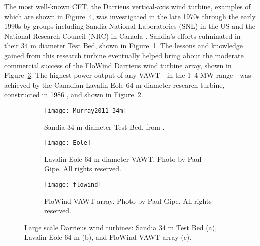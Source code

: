 The most well-known CFT, the Darrieus vertical-axis wind turbine, examples of
which are shown in Figure~\ref{fig:Darrieus}, was investigated in the late 1970s
through the early 1990s by groups including Sandia National Laboratories (SNL)
in the US and the National Research Council (NRC) in Canada \cite{Para2002}.
Sandia's efforts culminated in their 34 m diameter Test Bed, shown in
Figure~\ref{fig:Sandia-34m}. The lessons and knowledge gained from this research
turbine eventually helped bring about the moderate commercial success of the
FloWind Darrieus wind turbine array, shown in Figure~\ref{fig:FloWind}. The
highest power output of any VAWT---in the 1--4 MW range---was achieved by the
Canadian Lavalin Eole 64 m diameter research turbine, constructed in 1986
\cite{Para2002}, and shown in Figure~\ref{fig:Eole}.

\begin{figure}
    \centering

    \begin{subfigure}[b]{0.625\textwidth}
        \centering

        \texttt{[image: Murray2011-34m]}

        \caption{Sandia 34 m diameter Test Bed, from \cite{Murray2011}.}

        \label{fig:Sandia-34m}
    \end{subfigure}
    \hfill
    \begin{subfigure}[b]{0.352\textwidth}
        \centering

        \texttt{[image: Eole]}

        \caption{Lavalin Eole 64 m diameter VAWT. Photo by Paul Gipe. All rights
            reserved.}

        \label{fig:Eole}
    \end{subfigure}

    \begin{subfigure}[b]{0.8\textwidth}
        \centering

        \texttt{[image: flowind]}

        \caption{FloWind VAWT array. Photo by Paul Gipe. All rights reserved.}

        \label{fig:FloWind}
    \end{subfigure}

    \caption{Large scale Darrieus wind turbines: Sandia 34 m Test Bed (a),
        Lavalin Eole 64 m (b), and FloWind VAWT array (c).}

    \label{fig:Darrieus}
\end{figure}

